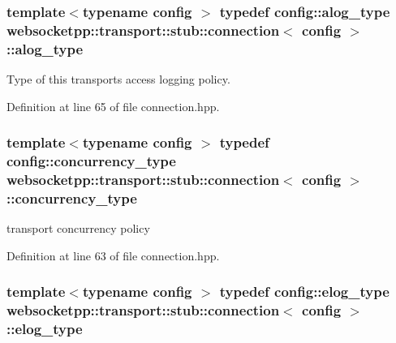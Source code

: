 \subsubsection[{alog\+\_\+type}]{\setlength{\rightskip}{0pt plus 5cm}template$<$typename config $>$ typedef config\+::alog\+\_\+type {\bf websocketpp\+::transport\+::stub\+::connection}$<$ config $>$\+::{\bf alog\+\_\+type}}\label{classwebsocketpp_1_1transport_1_1stub_1_1connection_ab3b726566d87b32c0ea2fac987a12881}


Type of this transport\textquotesingle{}s access logging policy. 



Definition at line 65 of file connection.\+hpp.

\hypertarget{classwebsocketpp_1_1transport_1_1stub_1_1connection_aeaf7e63605cd05c9f0d50739aa5980cc}{}
\subsubsection[{concurrency\+\_\+type}]{\setlength{\rightskip}{0pt plus 5cm}template$<$typename config $>$ typedef config\+::concurrency\+\_\+type {\bf websocketpp\+::transport\+::stub\+::connection}$<$ config $>$\+::{\bf concurrency\+\_\+type}}\label{classwebsocketpp_1_1transport_1_1stub_1_1connection_aeaf7e63605cd05c9f0d50739aa5980cc}


transport concurrency policy 



Definition at line 63 of file connection.\+hpp.

\hypertarget{classwebsocketpp_1_1transport_1_1stub_1_1connection_a24a76b753919af96513f67b3e51f7ecd}{}
\subsubsection[{elog\+\_\+type}]{\setlength{\rightskip}{0pt plus 5cm}template$<$typename config $>$ typedef config\+::elog\+\_\+type {\bf websocketpp\+::transport\+::stub\+::connection}$<$ config $>$\+::{\bf elog\+\_\+type}}\label{classwebsocketpp_1_1transport_1_1stub_1_1connection_a24a76b753919af96513f67b3e51f7ecd}


